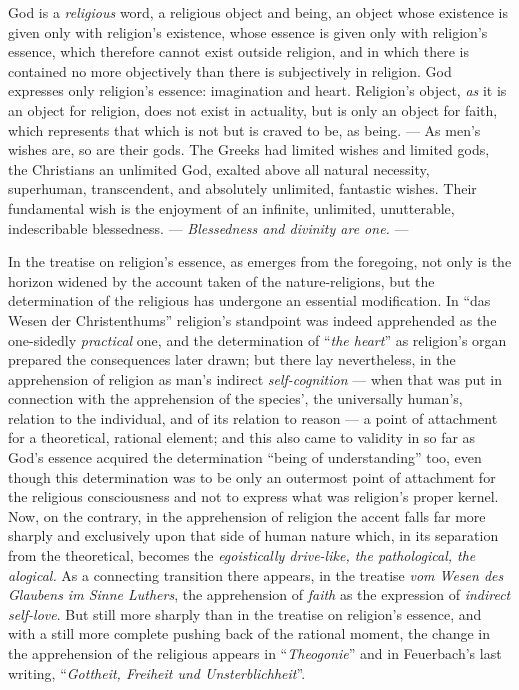 \documentclass[12pt,a4paper]{book}
\begin{document}
God is a \emph{religious} word, a religious object and being, an object whose
existence is given only with religion's existence, whose essence is given only
with religion's essence, which therefore cannot exist outside religion, and in
which there is contained no more objectively than there is subjectively in
religion. God expresses only religion's essence: imagination and heart.
Religion's object, \emph{as} it is an object for religion, does not exist in
actuality, but is only an object for faith, which represents that which is not
but is craved to be, as being. --- As men's wishes are, so are their gods. The
Greeks had limited wishes and limited gods, the Christians an unlimited God,
exalted above all natural necessity, superhuman, transcendent, and absolutely
unlimited, fantastic wishes. Their fundamental wish is the enjoyment of an
infinite, unlimited, unutterable, indescribable blessedness. ---
\emph{Blessedness and divinity are one.} ---

In the treatise on religion's essence, as emerges from the foregoing, not only
is the horizon widened by the account taken of the nature-religions, but the
determination of the religious has undergone an essential modification. In
``das Wesen der Christenthums'' religion's standpoint was indeed apprehended
as the one-sidedly \emph{practical} one, and the determination of
``\emph{the heart}'' as religion's organ prepared the consequences later
drawn; but there lay
nevertheless, in the apprehension of religion as man's indirect
\emph{self-cognition} --- when that was put in connection with the
apprehension of the species', the universally human's, relation to the
individual, and of its relation to reason --- a point of attachment for a
theoretical, rational element; and this also came to validity in so far as
God's essence acquired the determination ``being of understanding'' too, even
though this determination was to be only an outermost point of attachment for
the religious consciousness and not to express what was religion's proper
kernel. Now, on the contrary, in the apprehension of religion the accent falls
far more sharply and exclusively upon that side of human nature which, in its
separation from the theoretical, becomes the \emph{egoistically drive-like,
the pathological, the alogical.} As a connecting transition there appears, in
the treatise \emph{vom Wesen des Glaubens im Sinne Luthers}, the apprehension
of \emph{faith} as the expression of \emph{indirect self-love}. But still more
sharply than in the treatise on religion's essence, and with a still more
complete pushing back of the rational moment, the change in the apprehension
of the religious appears in ``\emph{Theogonie}'' and in Feuerbach's last
writing, ``\emph{Gottheit, Freiheit und Unsterblichheit}''.
\end{document}

